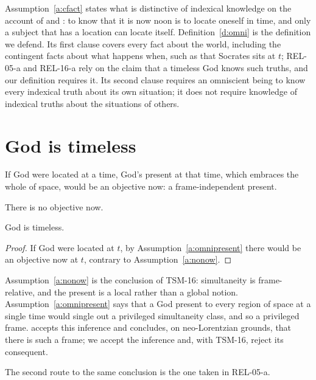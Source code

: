 \documentclass{situationist-preprint}
\begin{document}
Assumption~\ref{a:cfact} states what is distinctive of indexical knowledge on the account of \citet{Perry1979} and \citet{Lewis1979}: to know that it is now noon is to locate oneself in time, and only a subject that has a location can locate itself. Definition~\ref{d:omni} is the definition we defend. Its first clause covers every fact about the world, including the contingent facts about what happens when, such as that Socrates sits at $t$; REL-05-a and REL-16-a rely on the claim that a timeless God knows such truths, and our definition requires it. Its second clause requires an omniscient being to know every indexical truth about its own situation; it does not require knowledge of indexical truths about the situations of others.

\section{God is timeless}

\begin{assumption}[Omnipresence]\label{a:omnipresent}
If God were located at a time, God's present at that time, which embraces the whole of space, would be an objective now: a frame-independent present.
\end{assumption}

\begin{assumption}\label{a:nonow}
There is no objective now.
\end{assumption}

\begin{theorem}\label{t:timeless}
God is timeless.
\end{theorem}

\begin{proof}
If God were located at $t$, by Assumption~\ref{a:omnipresent} there would be an objective now at $t$, contrary to Assumption~\ref{a:nonow}.
\end{proof}

Assumption~\ref{a:nonow} is the conclusion of TSM-16: simultaneity is frame-relative, and the present is a local rather than a global notion. Assumption~\ref{a:omnipresent} says that a God present to every region of space at a single time would single out a privileged simultaneity class, and so a privileged frame. \citet{Craig2001} accepts this inference and concludes, on neo-Lorentzian grounds, that there is such a frame; we accept the inference and, with TSM-16, reject its consequent.

The second route to the same conclusion is the one taken in REL-05-a.
\end{document}
